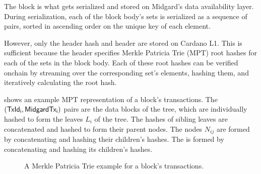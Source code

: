 \documentclass[../midgard.tex]{subfiles}
\begin{document}
The block is what gets serialized and stored on Midgard's data availability layer.
During serialization, each of the block body's sets is serialized as a sequence of pairs, sorted in ascending order on the unique key of each element.

However, only the header hash and header are stored on Cardano L1.
This is sufficient because the header specifies Merkle Patricia Trie (MPT) root hashes for each of the sets in the block body.
Each of these root hashes can be verified onchain by streaming over the corresponding set's elements, hashing them, and iteratively calculating the root hash.

 shows an example MPT representation of a block's transactions.
The $(\mathsf{TxId_i}, \mathsf{MidgardTx_i})$ pairs are the data blocks of the tree, which are individually hashed to form the leaves $L_i$ of the tree.
The hashes of sibling leaves are concatenated and hashed to form their parent nodes.
The nodes $N_{ij}$ are formed by concatenating and hashing their children's hashes.
The  is formed by concatenating and hashing its children's hashes.

\begin{figure}[htb]
\centering
{}
\caption{A Merkle Patricia Trie example for a block's transactions.}
\label{fig:block-tx-mpt}
\end{figure}
\end{document}
